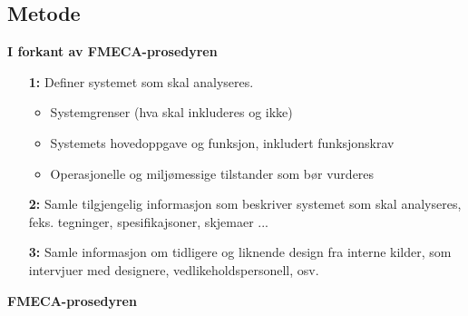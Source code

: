 \subsection{Metode}

\textbf{I forkant av FMECA-prosedyren}

\begin{itemize}
    \item[\textbf{1:}] Definer systemet som skal analyseres.
    \begin{itemize}
        \item Systemgrenser (hva skal inkluderes og ikke)
        \item Systemets hovedoppgave og funksjon, inkludert funksjonskrav
        \item Operasjonelle og miljømessige tilstander som bør vurderes
    \end{itemize}
    \item[\textbf{2:}] Samle tilgjengelig informasjon som beskriver systemet som skal analyseres, feks. tegninger, spesifikajsoner, skjemaer ...
    \item[\textbf{3:}] Samle informasjon om tidligere og liknende design fra interne kilder, som intervjuer med designere, vedlikeholdspersonell, osv.
\end{itemize}

\textbf{FMECA-prosedyren}

